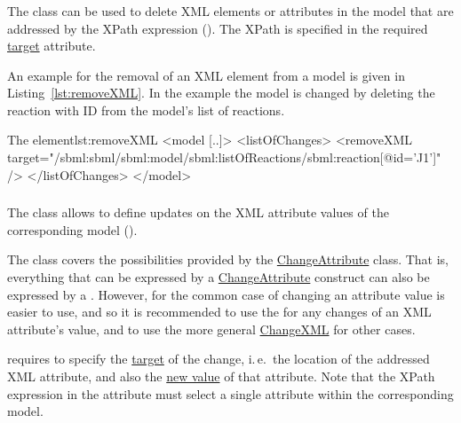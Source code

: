 \subsubsection{}
\label{class:removeXml}
The  class can be used to delete XML elements or attributes in the model that are addressed by the XPath expression (). The XPath is specified in the required \hyperref[sec:target]{target} attribute.

An example for the removal of an XML element from a model is given in Listing~\ref{lst:removeXML}. In the example the model is changed by deleting the reaction with ID  from the model's list of reactions.

\begin{myXmlLst}{The  element}{lst:removeXML}
<model [..]>
	<listOfChanges>
		<removeXML target="/sbml:sbml/sbml:model/sbml:listOfReactions/sbml:reaction[@id='J1']" />
	</listOfChanges>
</model>
\end{myXmlLst}


\subsubsection{}
\label{class:changeAttribute}
The  class allows to define updates on the XML attribute values of the corresponding model ().

The  class covers the possibilities provided by the \hyperref[class:changeAttribute]{ChangeAttribute} class. That is, everything that can be expressed by a \hyperref[class:changeAttribute]{ChangeAttribute} construct can also be expressed by a . However, for the common case of changing an attribute value  is easier to use, and so it is recommended to use the  for any changes of an XML attribute's value, and to use the more general \hyperref[class:changeXml]{ChangeXML} for other cases.

 requires to specify the \hyperref[sec:target]{target} of the change, i.\,e.\ the location of the addressed XML attribute, and also the \hyperref[sec:newValue]{new value} of that attribute.
Note that the XPath expression in the  attribute must select a single attribute within the corresponding model.


